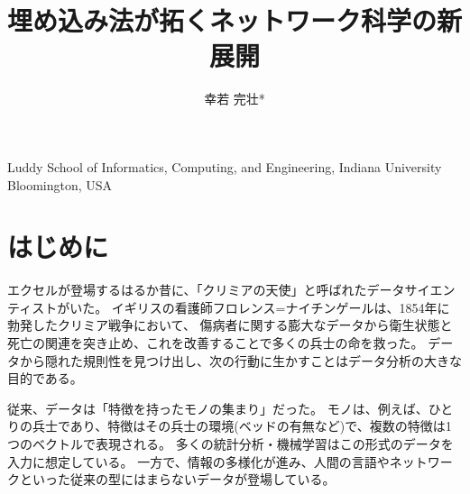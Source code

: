 \documentclass[J]{scitrans}
\begin{document}
\title{埋め込み法が拓くネットワーク科学の新展開}
\author{幸若 完壮*}


\maketitle


\address{*}{Luddy School of Informatics, Computing, and Engineering, Indiana University Bloomington, USA}


\section{はじめに}
\label{sec:introduction}


エクセルが登場するはるか昔に、「クリミアの天使」と呼ばれたデータサイエンティストがいた。
イギリスの看護師フロレンス=ナイチンゲールは、1854年に勃発したクリミア戦争において、
傷病者に関する膨大なデータから衛生状態と死亡の関連を突き止め、これを改善することで多くの兵士の命を救った。
データから隠れた規則性を見つけ出し、次の行動に生かすことはデータ分析の大きな目的である。

従来、データは「特徴を持ったモノの集まり」だった。
モノは、例えば、ひとりの兵士であり、特徴はその兵士の環境(ベッドの有無など)で、複数の特徴は1つのベクトルで表現される。
多くの統計分析・機械学習はこの形式のデータを入力に想定している。
一方で、情報の多様化が進み、人間の言語やネットワークといった従来の型にはまらないデータが登場している。
\end{document}
